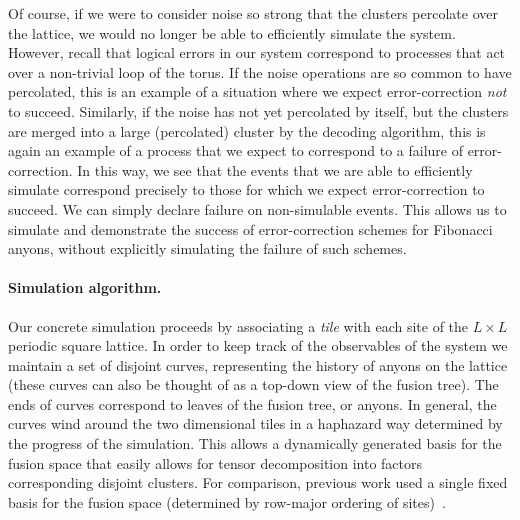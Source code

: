 \documentclass[aps, prl, letterpaper, twocolumn, superscriptaddress, notitlepage, 10pt]{revtex4-1}
\begin{document}
Of course, if we were to consider noise so strong that the clusters percolate over the lattice, we would no longer be able to efficiently simulate the system. However, recall that logical errors in our system correspond to processes that act over a non-trivial loop of the torus. If the noise operations are so common to have percolated, this is an example of a situation where we expect error-correction \emph{not} to succeed. Similarly, if the noise has not yet percolated by itself, but the clusters are merged into a large (percolated) cluster by the decoding algorithm, this is again an example of a process that we expect to correspond to a failure of error-correction. In this way, we see that the events that we are able to efficiently simulate correspond precisely to those for which we expect error-correction to succeed. We can simply declare failure on non-simulable events. This allows us to simulate and demonstrate the success of error-correction schemes for Fibonacci anyons, without explicitly simulating the failure of such schemes.

\paragraph{Simulation algorithm.}

	Our concrete simulation proceeds by associating a \emph{tile} with each site of the $L\times L$ periodic square lattice. In order to keep track of the observables of the system we maintain a set of disjoint curves, representing the history of anyons on the lattice (these curves can also be thought of as a top-down view of the fusion tree). The ends of curves correspond to leaves of the fusion tree, or anyons. In general, the curves wind around the two dimensional tiles in a haphazard way determined by the progress of the simulation. This allows a dynamically generated basis for the fusion space that easily allows for tensor decomposition into factors corresponding disjoint clusters. For comparison, previous work used a single fixed basis for the fusion space (determined by row-major ordering of sites)~\cite{Brell2013}.
\end{document}
